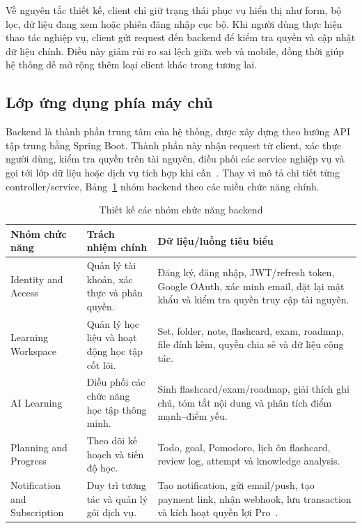 Về nguyên tắc thiết kế, client chỉ giữ trạng thái phục vụ hiển thị như form, bộ lọc, dữ liệu đang xem hoặc phiên đăng nhập cục bộ. Khi người dùng thực hiện thao tác nghiệp vụ, client gửi request đến backend để kiểm tra quyền và cập nhật dữ liệu chính. Điều này giảm rủi ro sai lệch giữa web và mobile, đồng thời giúp hệ thống dễ mở rộng thêm loại client khác trong tương lai.

\subsection{Lớp ứng dụng phía máy chủ}
\label{subsec:backend-application-design}

Backend là thành phần trung tâm của hệ thống, được xây dựng theo hướng API tập trung bằng Spring Boot. Thành phần này nhận request từ client, xác thực người dùng, kiểm tra quyền trên tài nguyên, điều phối các service nghiệp vụ và gọi tới lớp dữ liệu hoặc dịch vụ tích hợp khi cần~\cite{springbootdocs,springsecurityjwt}. Thay vì mô tả chi tiết từng controller/service, Bảng~\ref{tab:backend-application-design} nhóm backend theo các miền chức năng chính.

\begin{table}[htbp]
    \centering
    \small
    \caption{Thiết kế các nhóm chức năng backend}
    \label{tab:backend-application-design}
    \renewcommand{\arraystretch}{1.15}
    \begin{tabular}{|p{}|p{}|p{}|}
        \hline
        \textbf{Nhóm chức năng} & \textbf{Trách nhiệm chính} & \textbf{Dữ liệu/luồng tiêu biểu} \\
        \hline
        Identity and Access & Quản lý tài khoản, xác thực và phân quyền. & Đăng ký, đăng nhập, JWT/refresh token, Google OAuth, xác minh email, đặt lại mật khẩu và kiểm tra quyền truy cập tài nguyên. \\
        \hline
        Learning Workspace & Quản lý học liệu và hoạt động học tập cốt lõi. & Set, folder, note, flashcard, exam, roadmap, file đính kèm, quyền chia sẻ và dữ liệu cộng tác. \\
        \hline
        AI Learning & Điều phối các chức năng học tập thông minh. & Sinh flashcard/exam/roadmap, giải thích ghi chú, tóm tắt nội dung và phân tích điểm mạnh--điểm yếu. \\
        \hline
        Planning and Progress & Theo dõi kế hoạch và tiến độ học. & Todo, goal, Pomodoro, lịch ôn flashcard, review log, attempt và knowledge analysis. \\
        \hline
        Notification and Subscription & Duy trì tương tác và quản lý gói dịch vụ. & Tạo notification, gửi email/push, tạo payment link, nhận webhook, lưu transaction và kích hoạt quyền lợi Pro~\cite{payoswebhook}. \\
        \hline
    \end{tabular}
\end{table}

